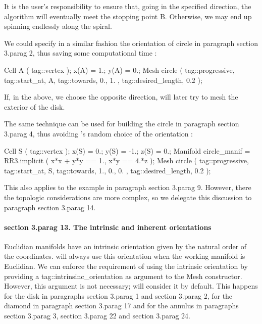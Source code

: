 It is the user's responsibility to ensure that, going in the specified direction,
the algorithm will eventually meet the stopping point {\codett B}.
Otherwise, we may end up spinning endlessly along the spiral.

We could specify in a similar fashion the orientation of {\codett circle} in paragraph
\numb section 3.\numb parag 2, thus saving some computational time :

\verbatim
   Cell A ( tag::vertex );  x(A) = 1.;  y(A) = 0.;
   Mesh circle ( tag::progressive, tag::start_at, A,
                 tag::towards, { 0., 1. }, tag::desired_length, 0.2 );
\endverbatim

If, in the above, we choose the opposite {\codett direc}tion,
{\maniFEM} will later try to mesh the exterior of the disk.

The same technique can be used for building the {\codett circle} in paragraph
\numb section 3.\numb parag 4, thus avoiding \maniFEM's random choice of the orientation :

\verbatim
   Cell S ( tag::vertex );  x(S) =  0.;   y(S) = -1.;  z(S) = 0.;
   Manifold circle_manif = RR3.implicit ( x*x + y*y == 1., x*y == 4.*z );
   Mesh circle ( tag::progressive, tag::start_at, S,
                 tag::towards, { 1., 0., 0. }, tag::desired_length, 0.2 );
\endverbatim

This also applies to the example in paragraph \numb section 3.\numb parag 9.
However, there the topologic considerations are more complex, so we delegate this
discussion to paragraph \numb section 3.\numb parag 14.


\vfil\eject
\paragraph{\numb section 3.\numb parag 13. The intrinsic and inherent orientations}

Euclidian manifolds have an intrinsic orientation given by the natural order of the
coordinates.
{\ManiFEM} will always use this orientation when the working manifold is Euclidian.
We can enforce the requirement of using the intrinsic orientation by providing a
{\codett tag::intrinsinc\_orientation} as argument to the {\codett Mesh} constructor.
However, this argument is not necessary; {\maniFEM} will consider it by default.
This happens for the {\codett disk} in paragraphs \numb section 3.\numb parag 1 and
\numb section 3.\numb parag 2, for the diamond in paragraph \numb section 3.\numb parag 17
and for the annulus in paragraphs \numb section 3.\numb parag 3, \numb section 3.\numb parag 22
and \numb section 3.\numb parag 24.

